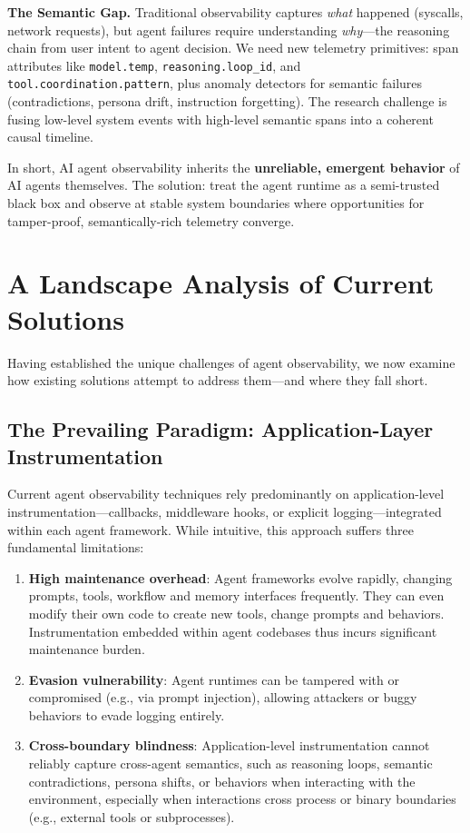 \documentclass[sigplan,screen,review,9pt]{acmart}
\begin{document}
\textbf{The Semantic Gap.} Traditional observability captures \emph{what} happened (syscalls, network requests), but agent failures require understanding \emph{why}—the reasoning chain from user intent to agent decision. We need new telemetry primitives: span attributes like \texttt{model.temp}, \texttt{reasoning.loop\_id}, and \texttt{tool.coordination.pattern}, plus anomaly detectors for semantic failures (contradictions, persona drift, instruction forgetting). The research challenge is fusing low-level system events with high-level semantic spans into a coherent causal timeline.

In short, AI agent observability inherits the \textbf{unreliable, emergent behavior} of AI agents themselves. The solution: treat the agent runtime as a semi-trusted black box and observe at stable system boundaries where opportunities for tamper-proof, semantically-rich telemetry converge.

\section{A Landscape Analysis of Current Solutions}

Having established the unique challenges of agent observability, we now examine how existing solutions attempt to address them—and where they fall short.

\subsection{The Prevailing Paradigm: Application-Layer Instrumentation}

Current agent observability techniques rely predominantly on application-level instrumentation—callbacks, middleware hooks, or explicit logging—integrated within each agent framework. While intuitive, this approach suffers three fundamental limitations:

\begin{enumerate}[leftmargin=*, itemsep=2pt]
  \item \textbf{High maintenance overhead}: Agent frameworks evolve rapidly, changing prompts, tools, workflow and memory interfaces frequently. They can even modify their own code to create new tools, change prompts and behaviors. Instrumentation embedded within agent codebases thus incurs significant maintenance burden.

  \item \textbf{Evasion vulnerability}: Agent runtimes can be tampered with or compromised (e.g., via prompt injection), allowing attackers or buggy behaviors to evade logging entirely.

  \item \textbf{Cross-boundary blindness}: Application-level instrumentation cannot reliably capture cross-agent semantics, such as reasoning loops, semantic contradictions, persona shifts, or behaviors when interacting with the environment, especially when interactions cross process or binary boundaries (e.g., external tools or subprocesses).
\end{enumerate}
\end{document}

